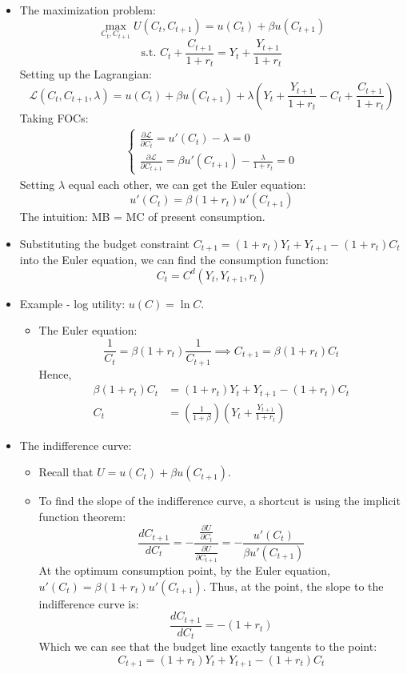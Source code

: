 \documentclass[notitlepage]{article}
\begin{document}
\begin{itemize}
\item The maximization problem:
\[
\max_{C_t, C_{t+1}} U(C_t, C_{t+1}) = u(C_t) + \beta u(C_{t+1})
\]
\[
\text{s.t. } C_t + \frac{C_{t+1}}{1+r_t} = Y_t + \frac{Y_{t+1}}{1+r_t}
\]
Setting up the Lagrangian:
\[
\mathcal{L}(C_t, C_{t+1}, \lambda) = u(C_t) + \beta u(C_{t+1}) + \lambda (Y_t + \frac{Y_{t+1}}{1+r_t} - C_t + \frac{C_{t+1}}{1+r_t})
\]
Taking FOCs:
\begin{align*}
\begin{cases}
\frac{\partial \mathcal{L}}{\partial C_{t}} = u'(C_t) - \lambda = 0 \\
\frac{\partial \mathcal{L}}{\partial C_{t+1}} = \beta u'(C_{t+1}) - \frac{\lambda}{1+r_t} = 0
\end{cases}
\end{align*}
Setting $\lambda$ equal each other, we can get the Euler equation:
\[
u'(C_t) = \beta(1+r_t)u'(C_{t+1})
\]
The intuition: MB = MC of present consumption.
\item Substituting the budget constraint $C_{t+1} = (1+r_t)Y_t + Y_{t+1} - (1+r_t)C_t$ into the Euler equation, we can find the consumption function:
\[
C_t = C^d(Y_t, Y_{t+1}, r_t)
\]

\item Example - log utility: $u(C) = \ln C$.
\begin{itemize}
\item The Euler equation:
\[
\frac{1}{C_t} = \beta(1+r_t)\frac{1}{C_{t+1}} \implies C_{t+1} = \beta(1+r_t)C_t
\]
Hence,
\begin{align*}
\beta(1+r_t)C_t &= (1+r_t)Y_t + Y_{t+1} - (1+r_t)C_t \\
C_t &= \left(\frac{1}{1+\beta}\right)\left(Y_t + \frac{Y_{t+1}}{1+r_t}\right)
\end{align*}
\end{itemize}

\item The indifference curve:
\begin{itemize}
\item Recall that $U = u(C_t) + \beta u(C_{t+1})$.
\item To find the slope of the indifference curve, a shortcut is using the implicit function theorem:
\[
\frac{d C_{t+1}}{dC_t} = -\frac{\frac{\partial U}{\partial C_t}}{\frac{\partial U}{\partial C_{t+1}}} = - \frac{u'(C_t)}{\beta u'(C_{t+1})}
\]
At the optimum consumption point, by the Euler equation, $u'(C_t) = \beta(1+r_t)u'(C_{t+1})$. Thus, at the point, the slope to the indifference curve is:
\[
\frac{d C_{t+1}}{dC_t} = -(1+r_t)
\]
Which we can see that the budget line exactly tangents to the point:
\[
C_{t+1} = (1+r_t)Y_t + Y_{t+1} - (1+r_t)C_t
\]
\end{itemize}
\end{itemize}
\end{document}
